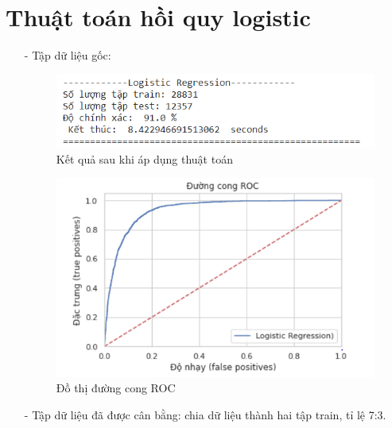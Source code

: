 \documentclass{report}
\begin{document}
\section{Thuật toán hồi quy logistic}
     \fontsize{13}{14}\selectfont
     \begin{enumerate}
    \item [- ]	Tập dữ liệu gốc:
\pagebreak
         \begin{center}
        \begin{figure}[htp]
    	\begin{center}
    		\includegraphics[scale =0.8]{images/lr_o.PNG}
    	\end{center}
    		\caption{Kết quả sau khi áp dụng thuật toán}
    \end{figure}
        \end{center} 
                 \begin{center}
        \begin{figure}[htp]
    	\begin{center}
    		\includegraphics[scale =1]{images/lr_roc_o.PNG}
    	\end{center}
    		\caption{Đồ thị đường cong ROC}
    \end{figure}
        \end{center} 
    \item [- ]	Tập dữ liệu đã được cân bằng: chia dữ liệu thành hai tập train, tỉ lệ 7:3.
         \begin{center}

\end{center}
\end{enumerate}
\end{document}
